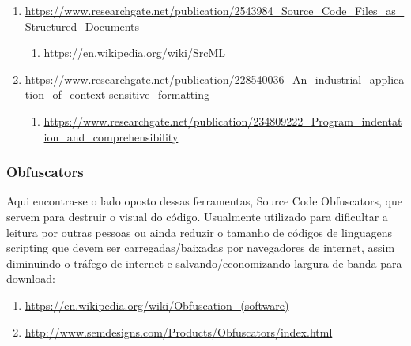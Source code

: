 \begin{englishtext}
\begin{sloppypar}
\begin{bluebox}
\begin{enumerate}[leftmargin=*,parsep=0pt]
    \item \url{https://www.researchgate.net/publication/2543984_Source_Code_Files_as_Structured_Documents}
    \begin{enumerate}[nolistsep,topsep=0pt,label=$\star$]
        \item \url{https://en.wikipedia.org/wiki/SrcML}
    \end{enumerate}

    \item \url{https://www.researchgate.net/publication/228540036_An_industrial_application_of_context-sensitive_formatting}
    \begin{enumerate}[nolistsep,topsep=0pt,label=$\star$]
        \item \url{https://www.researchgate.net/publication/234809222_Program_indentation_and_comprehensibility}
    \end{enumerate}

\end{enumerate}
\end{bluebox}
\end{sloppypar}


\subsubsection{Obfuscators}

    Aqui encontra-se o lado oposto dessas ferramentas, Source Code Obfuscators, que servem para
    destruir o visual do código. Usualmente utilizado para dificultar a leitura por outras pessoas
    ou ainda reduzir o tamanho de códigos de linguagens scripting que devem ser carregadas/baixadas
    por navegadores de internet, assim diminuindo o tráfego de internet e salvando/economizando
    largura de banda para download:

    \begin{sloppypar}
    \begin{bluebox}\RaggedRight
    \begin{enumerate}[leftmargin=*,parsep=0pt]

    \item \url{https://en.wikipedia.org/wiki/Obfuscation_(software)}

    \item \url{http://www.semdesigns.com/Products/Obfuscators/index.html}

    \end{enumerate}
    \end{bluebox}
    \end{sloppypar}



\end{englishtext}




